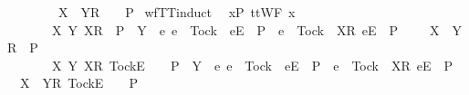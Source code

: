 \begin{isabellebody}
{\ \ \ \ \ {\isasymlongrightarrow}\ {\isasymrho}\ {\isacharat}\ {\isacharbrackleft}{\isacharbrackleft}X\ {\isasymunion}\ Y{\isacharbrackright}\isactrlsub R{\isacharbrackright}\ {\isacharat}\ {\isasymsigma}\ {\isasymin}\ P{\isacharparenright}{\isachardoublequoteclose}%
}%
\isamarkupfalse%
\ wf{\isacharunderscore}TT{}{\isacharunderscore}induct{\isacharcolon}\isanewline
\ \ {\isachardoublequoteopen}{\isasymforall}x{\isasymin}P{\isachardot}\ ttWF\ x\ {\isasymLongrightarrow}\isanewline
\ \ \ \ {\isacharparenleft}{\isasymAnd}\ {\isasymrho}\ {\isasymsigma}\ X\ Y{\isachardot}\ {\isacharparenleft}{\isacharbrackleft}{\isacharbrackleft}X{\isacharbrackright}\isactrlsub R{\isacharbrackright}\ {\isasymin}\ P\ {\isasymand}\ {\isacharparenleft}Y\ {\isasyminter}\ {\isacharbraceleft}e{\isachardot}\ {\isacharparenleft}e\ {\isasymnoteq}\ Tock\ {\isasymand}\ {\isacharbrackleft}{\isacharbrackleft}e{\isacharbrackright}\isactrlsub E{\isacharbrackright}\ {\isasymin}\ P{\isacharparenright}\ {\isasymor}\ {\isacharparenleft}e\ {\isacharequal}\ Tock\ {\isasymand}\ {\isacharbrackleft}{\isacharbrackleft}X{\isacharbrackright}\isactrlsub R{\isacharcomma}\ {\isacharbrackleft}e{\isacharbrackright}\isactrlsub E{\isacharbrackright}\ {\isasymin}\ P{\isacharparenright}\ {\isacharbraceright}\ {\isacharequal}\ {\isacharbraceleft}{\isacharbraceright}{\isacharparenright}{\isacharparenright}\ {\isasymLongrightarrow}\ {\isacharbrackleft}{\isacharbrackleft}X\ {\isasymunion}\ Y{\isacharbrackright}\isactrlsub R{\isacharbrackright}\ {\isasymin}\ P{\isacharparenright}\ {\isasymLongrightarrow}\isanewline
\ \ \ \ {\isacharparenleft}{\isasymAnd}\ {\isasymrho}\ {\isasymsigma}\ X\ Y{\isachardot}\ {\isacharparenleft}{\isacharbrackleft}{\isacharbrackleft}X{\isacharbrackright}\isactrlsub R{\isacharcomma}\ {\isacharbrackleft}Tock{\isacharbrackright}\isactrlsub E{\isacharbrackright}\ {\isacharat}\ {\isasymsigma}\ {\isasymin}\ P\ {\isasymand}\ {\isacharparenleft}Y\ {\isasyminter}\ {\isacharbraceleft}e{\isachardot}\ e\ {\isasymnoteq}\ Tock\ {\isasymand}\ {\isacharbrackleft}{\isacharbrackleft}e{\isacharbrackright}\isactrlsub E{\isacharbrackright}\ {\isasymin}\ P\ {\isasymor}\ e\ {\isacharequal}\ Tock\ {\isasymand}\ {\isacharbrackleft}{\isacharbrackleft}X{\isacharbrackright}\isactrlsub R{\isacharcomma}\ {\isacharbrackleft}e{\isacharbrackright}\isactrlsub E{\isacharbrackright}\ {\isasymin}\ P{\isacharbraceright}\ {\isacharequal}\ {\isacharbraceleft}{\isacharbraceright}{\isacharparenright}{\isacharparenright}\ {\isasymLongrightarrow}\ {\isacharbrackleft}{\isacharbrackleft}X\ {\isasymunion}\ Y{\isacharbrackright}\isactrlsub R{\isacharcomma}\ {\isacharbrackleft}Tock{\isacharbrackright}\isactrlsub E{\isacharbrackright}\ {\isacharat}\ {\isasymsigma}\ {\isasymin}\ P{\isacharparenright}\ {\isasymLongrightarrow}\isanewline

\end{isabellebody}
